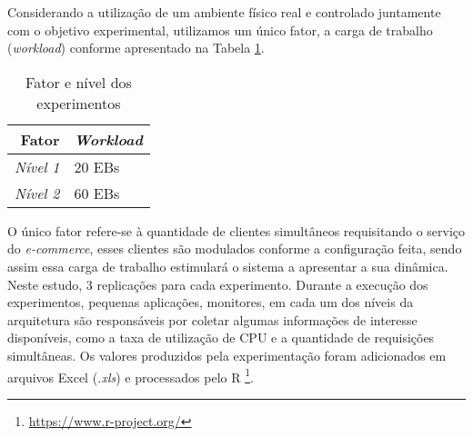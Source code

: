 Considerando a utilização de um ambiente físico real e controlado juntamente com o objetivo experimental, utilizamos um único fator, a carga de trabalho (\textit{workload}) conforme apresentado na Tabela \ref{tab:fatores_niveis}.
\begin{table}[htb]
	\centering
	\caption{Fator e nível dos experimentos}
	\label{tab:fatores_niveis}
	\begin{tabularx}{\textwidth}{|r|X|} \hline\hline
		\textbf{Fator}		& \textbf{\textit{Workload}} \\ \hline
		\textit{Nível 1}	&		20 EBs				 \\
		\textit{Nível 2}	&		60 EBs				 \\		
		\hline
	\end{tabularx}
	\fdadospesquisa
\end{table}

O único fator refere-se à quantidade de clientes simultâneos requisitando o serviço do \textit{e-commerce}, esses clientes são modulados conforme a configuração feita, sendo assim essa carga de trabalho estimulará o sistema a apresentar a sua dinâmica. Neste estudo, 3 replicações para cada experimento.
Durante a execução dos experimentos, pequenas aplicações, monitores, em cada um dos níveis da arquitetura são responsáveis por coletar algumas informações de interesse disponíveis, como a taxa de utilização de CPU e a quantidade de requisições simultâneas. Os valores produzidos pela experimentação foram adicionados em arquivos Excel (\textit{.xls}) e processados pelo R \footnote{\url{https://www.r-project.org/}}.
